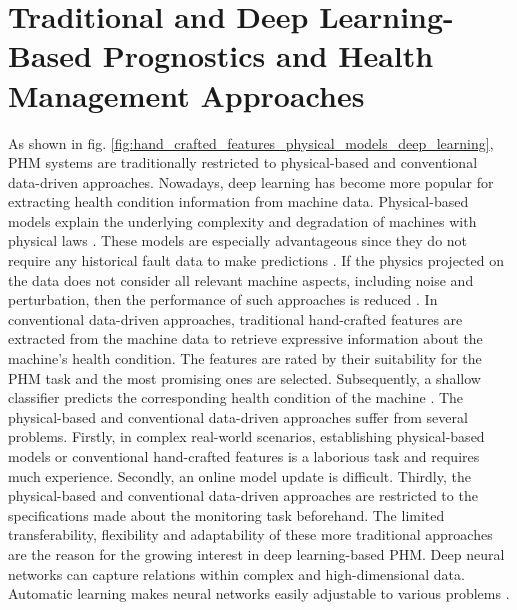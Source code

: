 \section{Traditional and Deep Learning-Based Prognostics and Health Management Approaches}
As shown in fig. \ref{fig:hand_crafted_features_physical_models_deep_learning}, PHM systems are traditionally restricted to physical-based and conventional data-driven approaches. Nowadays, deep learning has become more popular for extracting health condition information from machine data. Physical-based models explain the underlying complexity and degradation of machines with physical laws \cite{ZHAO2019213}. These models are especially advantageous since they do not require any historical fault data to make predictions \cite{Benker2019}. If the physics projected on the data does not consider all relevant machine aspects, including noise and perturbation, then the performance of such approaches is reduced \cite{ZHAO2019213}. In conventional data-driven approaches, traditional hand-crafted features are extracted from the machine data to retrieve expressive information about the machine's health condition. The features are rated by their suitability for the PHM task and the most promising ones are selected. Subsequently, a shallow classifier predicts the corresponding health condition of the machine \cite{ZHAO2019213}. The physical-based and conventional data-driven approaches suffer from several problems. Firstly, in complex real-world scenarios, establishing physical-based models or conventional hand-crafted features is a laborious task and requires much experience. Secondly, an online model update is difficult. Thirdly, the physical-based and conventional data-driven approaches are restricted to the specifications made about the monitoring task beforehand. The limited transferability, flexibility and adaptability of these more traditional approaches are the reason for the growing interest in deep learning-based PHM. Deep neural networks can capture relations within complex and high-dimensional data. Automatic learning makes neural networks easily adjustable to various problems \cite{ZHAO2019213}.
